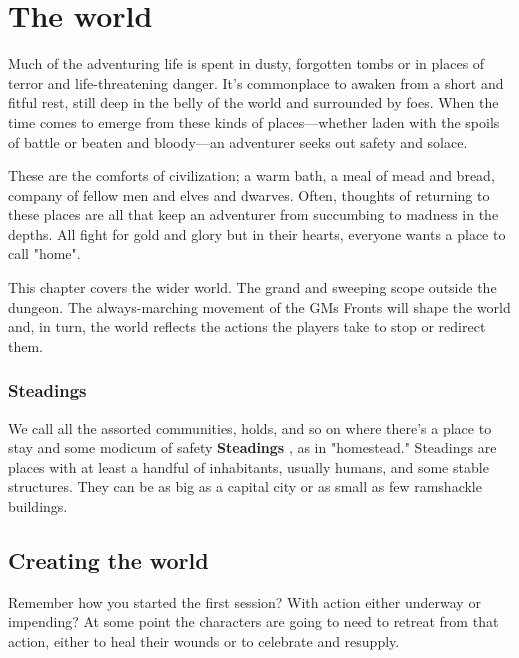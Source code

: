 \chapter{The world}
  
 



Much of the adventuring life is spent in dusty, forgotten tombs or in places of terror and life-threatening danger. It's commonplace to awaken from a short and fitful rest, still deep in the belly of the world and surrounded by foes. When the time comes to emerge from these kinds of places—whether laden with the spoils of battle or beaten and bloody—an adventurer seeks out safety and solace.

 

These are the comforts of civilization; a warm bath, a meal of mead and bread, company of fellow men and elves and dwarves. Often, thoughts of returning to these places are all that keep an adventurer from succumbing to madness in the depths. All fight for gold and glory but in their hearts, everyone wants a place to call "home".

 

This chapter covers the wider world. The grand and sweeping scope outside the dungeon. The always-marching movement of the GMs Fronts will shape the world and, in turn, the world reflects the actions the players take to stop or redirect them.

 
\subsection{Steadings}   
 

We call all the assorted communities, holds, and so on where there's a place to stay and some modicum of safety {\bf Steadings} , as in "homestead." Steadings are places with at least a handful of inhabitants, usually humans, and some stable structures. They can be as big as a capital city or as small as few ramshackle buildings.

 
\section{Creating the world}   
 

Remember how you started the first session? With action either underway or impending? At some point the characters are going to need to retreat from that action, either to heal their wounds or to celebrate and resupply.

